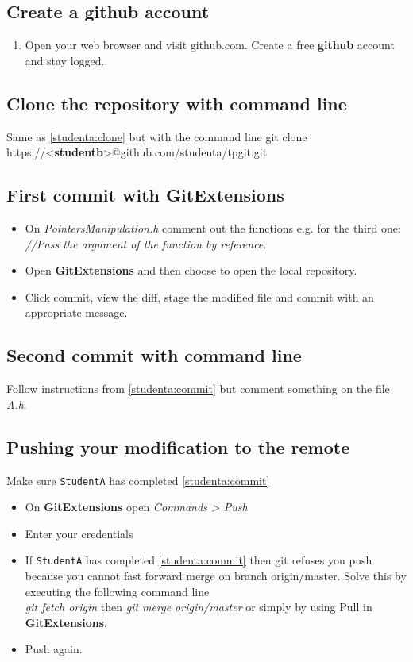 \documentclass[11pt,amsfonts,amsmath]{article}
\begin{document}
\subsection{Create a \textbf{github} account}\label{studentb:create}
\begin{enumerate}
\item Open your web browser and visit github.com. Create a free \textbf{github} account and stay logged.
\end{enumerate}
\subsection{Clone the repository with command line}
Same as \ref{studenta:clone} but with the command line  git clone https://<\textbf{studentb}>@github.com/studenta/tpgit.git
\subsection{First commit with \textbf{GitExtensions}}\label{studentb:commitgitext}
\begin{itemize}
\item On \emph{PointersManipulation.h} comment out the functions e.g. for the third one:\\
\emph{//Pass the argument of the function by reference.}
\item Open \textbf{GitExtensions} and then choose to open the local repository.
\item Click commit, view the diff, stage the modified file and commit with an appropriate message.
\end{itemize}
\subsection{Second commit with command line}
Follow instructions from \ref{studenta:commit} but comment something on the file \emph{A.h}.
\subsection{Pushing your modification to the remote}\label{studentb:pull}
Make sure \texttt{StudentA} has completed \ref{studenta:commit}
\begin{itemize}
\item On \textbf{GitExtensions} open \emph{Commands > Push}
\item Enter your credentials
\item If  \texttt{StudentA} has completed \ref{studenta:commit} then git refuses you push because you cannot fast forward merge on branch origin/master.
Solve this by executing the following command line\\
\emph{git fetch origin} then \emph{git merge origin/master} or simply by using Pull in \textbf{GitExtensions}.
\item Push again.
\end{itemize}
\end{document}
